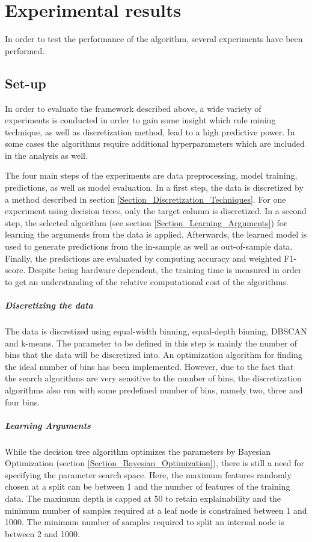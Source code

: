 \chapter{Experimental results}

In order to test the performance of the algorithm, several experiments have been performed.

\section{Set-up}
In order to evaluate the framework described above, a wide variety of experiments is conducted in order to gain some insight which rule mining technique, as well as discretization method, lead to a high predictive power. In some cases the algorithms require additional hyperparameters which are included in the analysis as well. 

The four main steps of the experiments are data preprocessing, model training, predictions, as well as model evaluation. In a first step, the data is discretized by a method described in section \ref{Section_Discretization_Techniques}. For one experiment using decision trees, only the target column is discretized. In a second step, the selected algorithm (see section \ref{Section_Learning_Arguments}) for learning the arguments from the data is applied. Afterwards, the learned model is used to generate predictions from the in-sample as well as out-of-sample data. Finally, the predictions are evaluated by computing accuracy and weighted F1-score. Despite being hardware dependent, the training time is measured in order to get an understanding of the relative computational cost of the algorithms. 

\paragraph*{Discretizing the data}
The data is discretized using equal-width binning, equal-depth binning, DBSCAN and k-means. The parameter to be defined in this step is mainly the number of bins that the data will be discretized into. An optimization algorithm for finding the ideal number of bins has been implemented. However, due to the fact that the search algorithms are very sensitive to the number of bins, the discretization algorithms also run with some predefined number of bins, namely two, three and four bins. 

\paragraph*{Learning Arguments}
While the decision tree algorithm optimizes the parameters by Bayesian Optimization (section \ref{Section_Bayesian_Optimization}), there is still a need for specifying the parameter search space. Here, the maximum features randomly chosen at a split can be between 1 and the number of features of the training data. The maximum depth is capped at 50 to retain explainability and the minimum number of samples required at a leaf node is constrained between 1 and 1000. The minimum number of samples required to split an internal node is between 2 and 1000. 
 
